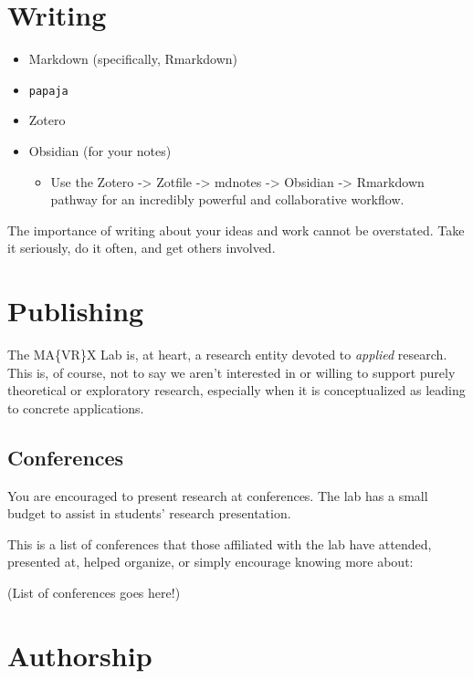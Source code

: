 \documentclass[]{tufte-book}
\providecommand{\tightlist}{%
  \setlength{\itemsep}{0pt}\setlength{\parskip}{0pt}}
\begin{document}
\hypertarget{writing}{%
\section{Writing}\label{writing}}

\begin{itemize}
\tightlist
\item
  Markdown (specifically, Rmarkdown)
\item
  \texttt{papaja}
\item
  Zotero
\item
  Obsidian (for your notes)

  \begin{itemize}
  \tightlist
  \item
    Use the Zotero -\textgreater{} Zotfile -\textgreater{} mdnotes -\textgreater{} Obsidian -\textgreater{} Rmarkdown pathway for an incredibly powerful and collaborative workflow.
  \end{itemize}
\end{itemize}

The importance of writing about your ideas and work cannot be overstated. Take it seriously, do it often, and get others involved.

\hypertarget{publishing}{%
\section{Publishing}\label{publishing}}

The MA\{VR\}X Lab is, at heart, a research entity devoted to \emph{applied} research. This is, of course, not to say we aren't interested in or willing to support purely theoretical or exploratory research, especially when it is conceptualized as leading to concrete applications.

\hypertarget{conferences}{%
\subsection{Conferences}\label{conferences}}

You are encouraged to present research at conferences. The lab has a small budget to assist in students' research presentation.

This is a list of conferences that those affiliated with the lab have attended, presented at, helped organize, or simply encourage knowing more about:

(List of conferences goes here!)

\hypertarget{authorship}{%
\section{Authorship}\label{authorship}}
\end{document}
